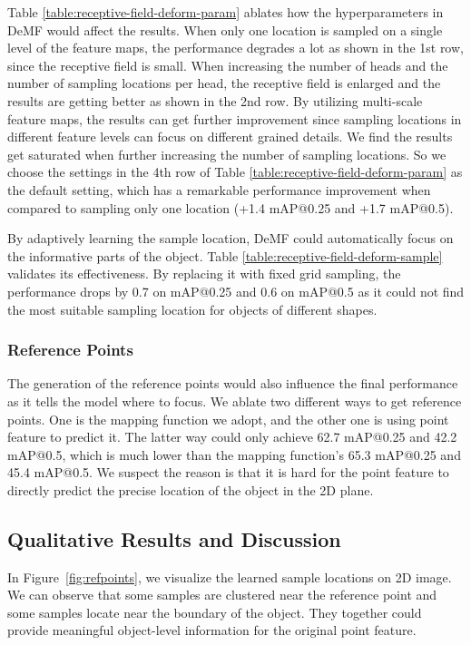 \documentclass[runningheads]{llncs}
\begin{document}
Table \ref{table:receptive-field-deform-param} ablates how the hyperparameters in DeMF would affect the results. When only one location is sampled on a single level of the feature maps, the performance degrades a lot as shown in the 1st row, since the receptive field is small. When increasing the number of heads and the number of sampling locations per head, the receptive field is enlarged and the results are getting better as shown in the 2nd row. By utilizing multi-scale feature maps, the results can get further improvement since sampling locations in different feature levels can focus on different grained details. We find the results get saturated when further increasing the number of sampling locations. So we choose the settings in the 4th row of Table \ref{table:receptive-field-deform-param} as the default setting, which has a remarkable performance improvement when compared to sampling only one location (+1.4 mAP@0.25 and +1.7 mAP@0.5).

By adaptively learning the sample location, DeMF could automatically focus on the informative parts of the object. Table \ref{table:receptive-field-deform-sample} validates its effectiveness. By replacing it with fixed grid sampling, the performance drops by 0.7 on mAP@0.25 and 0.6 on mAP@0.5 as it could not find the most suitable sampling location for objects of different shapes.


\subsubsection{Reference Points} 

The generation of the reference points would also influence the final performance as it tells the model where to focus. We ablate two different ways to get reference points. One is the mapping function we adopt, and the other one is using point feature to predict it. The latter way could only achieve 62.7 mAP@0.25 and 42.2 mAP@0.5, which is much lower than the mapping function's 65.3 mAP@0.25 and 45.4 mAP@0.5. We suspect the reason is that it is hard for the point feature to directly predict the precise location of the object in the 2D plane.



\subsection{Qualitative Results and Discussion}

In Figure~\ref{fig:refpoints}, we visualize the learned sample locations on 2D image. We can observe that some samples are clustered near the reference point and some samples locate near the boundary of the object. They together could provide meaningful object-level information for the original point feature.
\end{document}
